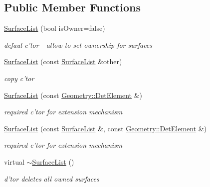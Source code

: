 \subsection*{Public Member Functions}
\begin{DoxyCompactItemize}
\item 
\hyperlink{class_d_d4hep_1_1_d_d_rec_1_1_surface_list_abc669093649a9e2714176cd2162f75b5}{SurfaceList} (bool isOwner=false)
\begin{DoxyCompactList}\small\item\em defaul c'tor -\/ allow to set ownership for surfaces \item\end{DoxyCompactList}\item 
\hyperlink{class_d_d4hep_1_1_d_d_rec_1_1_surface_list_a0815581e1cd48827919bd78fdc01107c}{SurfaceList} (const \hyperlink{class_d_d4hep_1_1_d_d_rec_1_1_surface_list}{SurfaceList} \&other)
\begin{DoxyCompactList}\small\item\em copy c'tor \item\end{DoxyCompactList}\item 
\hyperlink{class_d_d4hep_1_1_d_d_rec_1_1_surface_list_af1e802fd9aee21769c7ff3a3ed7f2e65}{SurfaceList} (const \hyperlink{class_d_d4hep_1_1_geometry_1_1_det_element}{Geometry::DetElement} \&)
\begin{DoxyCompactList}\small\item\em required c'tor for extension mechanism \item\end{DoxyCompactList}\item 
\hyperlink{class_d_d4hep_1_1_d_d_rec_1_1_surface_list_a1655044af6ad83e5d51e8513718a8f34}{SurfaceList} (const \hyperlink{class_d_d4hep_1_1_d_d_rec_1_1_surface_list}{SurfaceList} \&, const \hyperlink{class_d_d4hep_1_1_geometry_1_1_det_element}{Geometry::DetElement} \&)
\begin{DoxyCompactList}\small\item\em required c'tor for extension mechanism \item\end{DoxyCompactList}\item 
virtual \hyperlink{class_d_d4hep_1_1_d_d_rec_1_1_surface_list_a8ba1884b4e65fbd42703cb8059cb0fb2}{$\sim$SurfaceList} ()
\begin{DoxyCompactList}\small\item\em d'tor deletes all owned surfaces \item\end{DoxyCompactList}\end{DoxyCompactItemize}
